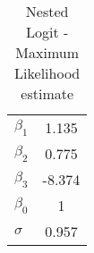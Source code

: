 \begin{table}[htb]
\centering
\caption{Nested Logit - Maximum Likelihood estimate}\label{tab:nestmv}
\begin{tabular}{lc}
 \hline 
$\beta_1$ & 1.135 \\ 
$\beta_2$ & 0.775 \\ 
$\beta_3$ & -8.374 \\ 
$\beta_0$ & 1 \\ 
$\sigma$ & 0.957 \\ 
\hline
\end{tabular}
\end{table}

